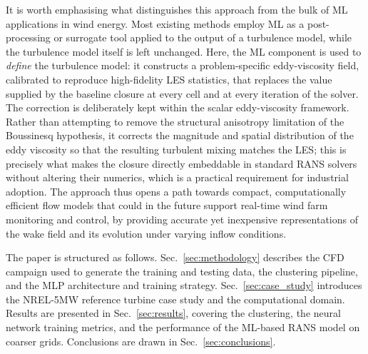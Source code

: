 It is worth emphasising what distinguishes this approach from the bulk of ML applications in wind energy. Most existing methods employ ML as a post-processing or surrogate tool applied to the output of a turbulence model, while the turbulence model itself is left unchanged. Here, the ML component is used to \emph{define} the turbulence model: it constructs a problem-specific eddy-viscosity field, calibrated to reproduce high-fidelity LES statistics, that replaces the value supplied by the baseline closure at every cell and at every iteration of the solver. The correction is deliberately kept within the scalar eddy-viscosity framework. Rather than attempting to remove the structural anisotropy limitation of the Boussinesq hypothesis, it corrects the magnitude and spatial distribution of the eddy viscosity so that the resulting turbulent mixing matches the LES; this is precisely what makes the closure directly embeddable in standard RANS solvers without altering their numerics, which is a practical requirement for industrial adoption. The approach thus opens a path towards compact, computationally efficient flow models that could in the future support real-time wind farm monitoring and control, by providing accurate yet inexpensive representations of the wake field and its evolution under varying inflow conditions.

The paper is structured as follows. Sec.~\ref{sec:methodology} describes the CFD campaign used to generate the training and testing data, the clustering pipeline, and the MLP architecture and training strategy. Sec.~\ref{sec:case_study} introduces the NREL-5MW reference turbine case study and the computational domain. Results are presented in Sec.~\ref{sec:results}, covering the clustering, the neural network training metrics, and the performance of the ML-based RANS model on coarser grids. Conclusions are drawn in Sec.~\ref{sec:conclusions}.
